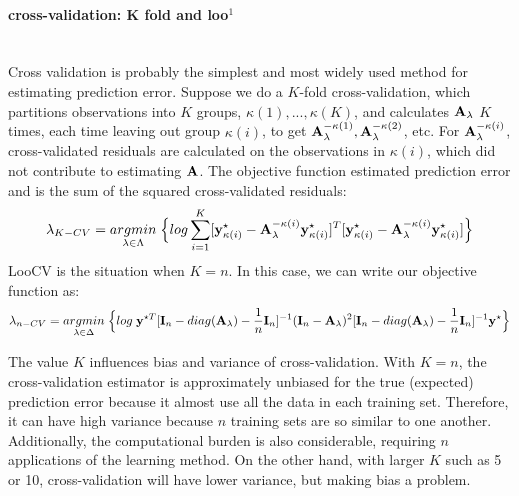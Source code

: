 \documentclass[11pt]{article}
\begin{document}
\paragraph{cross-validation: K fold and loo$^{1}$}\mbox{}\\
Cross validation is probably the simplest and most widely used method for estimating prediction error. Suppose we do a $K$-fold cross-validation, which partitions observations into $K$ groups, $\kappa(1),...,\kappa(K)$, and calculates ${\bf A}_\lambda$ $K$ times, each time leaving out group $\kappa(i)$, to get ${\bf A}_\lambda^{-\kappa(1)}, {\bf A}_\lambda^{-\kappa(2)}$, etc. For ${\bf A}_\lambda^{-\kappa(i)}$, cross-validated residuals are calculated on the observations in $\kappa(i)$, which did not contribute to estimating ${\bf A}$. The objective function estimated prediction error and is the sum of the squared cross-validated residuals:
\begin{align}
\lambda_{K-CV}=\underset{\lambda \in \Lambda}{argmin}\;\Big\{log\sum_{i=1}^K[{\bf y}_{\kappa(i)}^\star-{\bf A}_\lambda^{-\kappa(i)}{\bf y}_{\kappa(i)}^\star]^T[{\bf y}_{\kappa(i)}^\star-{\bf A}_\lambda^{-\kappa(i)}{\bf y}_{\kappa(i)}^\star]\Big\}
\end{align}
LooCV is the situation when $K=n$. In this case, we can write our objective function as:
\begin{align}
\lambda_{n-CV}=\underset{\lambda \in \Delta}{argmin}\;\Big\{log\;{\bf y}^{\star T}[{\bf I}_n-diag({\bf A}_\lambda)-\frac{1}{n}{\bf I}_n]^{-1}({\bf I}_n-{\bf A}_\lambda)^2[{\bf I}_n-diag({\bf A}_\lambda)-\frac{1}{n}{\bf I}_n]^{-1}{\bf y}^\star \Big\}
\end{align}



The value $K$ influences bias and variance of cross-validation. With $K=n$, the cross-validation estimator is approximately unbiased for the true (expected) prediction error because it almost use all the data in each training set. Therefore, it can have high variance because $n$ training sets are so similar to one another. Additionally, the computational burden is also considerable, requiring $n$ applications of the learning method. On the other hand, with larger $K$ such as 5 or 10, cross-validation will have lower variance, but making bias a problem.
\end{document}
